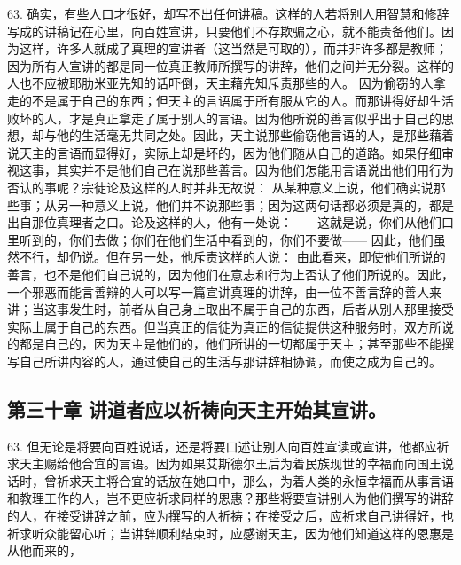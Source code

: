 63. 确实，有些人口才很好，却写不出任何讲稿。这样的人若将别人用智慧和修辞写成的讲稿记在心里，向百姓宣讲，只要他们不存欺骗之心，就不能责备他们。因为这样，许多人就成了真理的宣讲者（这当然是可取的），而并非许多都是教师；因为所有人宣讲的都是同一位真正教师所撰写的讲辞，他们之间并无分裂。这样的人也不应被耶肋米亚先知的话吓倒，天主藉先知斥责那些的人。 因为偷窃的人拿走的不是属于自己的东西；但天主的言语属于所有服从它的人。而那讲得好却生活败坏的人，才是真正拿走了属于别人的言语。因为他所说的善言似乎出于自己的思想，却与他的生活毫无共同之处。因此，天主说那些偷窃他言语的人，是那些藉着说天主的言语而显得好，实际上却是坏的，因为他们随从自己的道路。如果仔细审视这事，其实并不是他们自己在说那些善言。因为他们怎能用言语说出他们用行为否认的事呢？宗徒论及这样的人时并非无故说： 从某种意义上说，他们确实说那些事；从另一种意义上说，他们并不说那些事；因为这两句话都必须是真的，都是出自那位真理者之口。论及这样的人，他有一处说：——这就是说，你们从他们口里听到的，你们去做；你们在他们生活中看到的，你们不要做—— 因此，他们虽然不行，却仍说。但在另一处，他斥责这样的人说： 由此看来，即使他们所说的善言，也不是他们自己说的，因为他们在意志和行为上否认了他们所说的。因此，一个邪恶而能言善辩的人可以写一篇宣讲真理的讲辞，由一位不善言辞的善人来讲；当这事发生时，前者从自己身上取出不属于自己的东西，后者从别人那里接受实际上属于自己的东西。但当真正的信徒为真正的信徒提供这种服务时，双方所说的都是自己的，因为天主是他们的，他们所讲的一切都属于天主；甚至那些不能撰写自己所讲内容的人，通过使自己的生活与那讲辞相协调，而使之成为自己的。\par


\subsection{第三十章 讲道者应以祈祷向天主开始其宣讲。}

63. 但无论是将要向百姓说话，还是将要口述让别人向百姓宣读或宣讲，他都应祈求天主赐给他合宜的言语。因为如果艾斯德尔王后为着民族现世的幸福而向国王说话时，曾祈求天主将合宜的话放在她口中，那么，为着人类的永恒幸福而从事言语和教理工作的人，岂不更应祈求同样的恩惠？那些将要宣讲别人为他们撰写的讲辞的人，在接受讲辞之前，应为撰写的人祈祷；在接受之后，应祈求自己讲得好，也祈求听众能留心听；当讲辞顺利结束时，应感谢天主，因为他们知道这样的恩惠是从他而来的，\par

